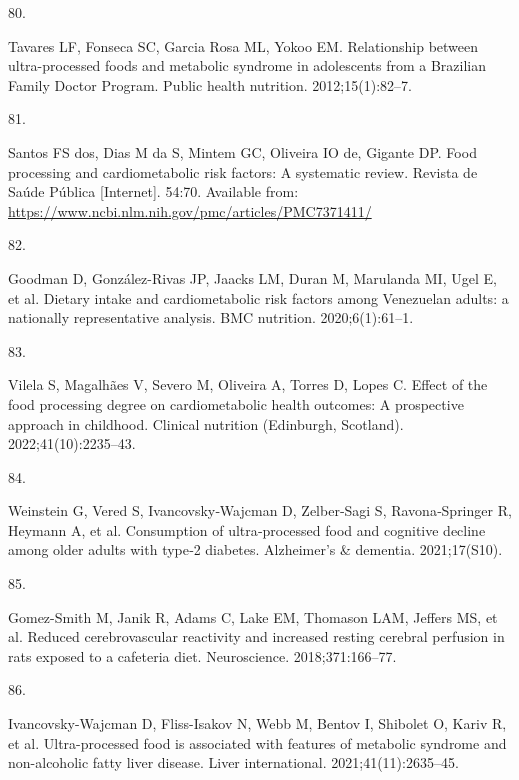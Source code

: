 \documentclass[
]{article}
\newlength{\cslhangindent}
\newlength{\csllabelwidth}
\newlength{\cslentryspacingunit} %
\newenvironment{CSLReferences}[2] %
 {%
  \setlength{\parindent}{0pt}
  \ifodd #1
  \let\oldpar\par
  \def\par{\hangindent=\cslhangindent\oldpar}
  \fi
  \setlength{\parskip}{#2\cslentryspacingunit}
 }%
 {}
\newcommand{\CSLLeftMargin}[1]{\parbox[t]{\csllabelwidth}{#1}}
\newcommand{\CSLRightInline}[1]{\parbox[t]{\linewidth - \csllabelwidth}{#1}\break}
\begin{document}
\begin{CSLReferences}{0}{0}
\leavevmode{}%
\CSLLeftMargin{80. }%
\CSLRightInline{Tavares LF, Fonseca SC, Garcia Rosa ML, Yokoo EM.
Relationship between ultra-processed foods and metabolic syndrome in
adolescents from a {Brazilian Family Doctor Program}. Public health
nutrition. 2012;15(1):82--7. }

\leavevmode{}%
\CSLLeftMargin{81. }%
\CSLRightInline{Santos FS dos, Dias M da S, Mintem GC, Oliveira IO de,
Gigante DP. Food processing and cardiometabolic risk factors: A
systematic review. Revista de Saúde Pública {[}Internet{]}. 54:70.
Available from:
\url{https://www.ncbi.nlm.nih.gov/pmc/articles/PMC7371411/}}

\leavevmode{}%
\CSLLeftMargin{82. }%
\CSLRightInline{Goodman D, González-Rivas JP, Jaacks LM, Duran M,
Marulanda MI, Ugel E, et al. Dietary intake and cardiometabolic risk
factors among Venezuelan adults: a nationally representative analysis.
BMC nutrition. 2020;6(1):61--1. }

\leavevmode{}%
\CSLLeftMargin{83. }%
\CSLRightInline{Vilela S, Magalhães V, Severo M, Oliveira A, Torres D,
Lopes C. Effect of the food processing degree on cardiometabolic health
outcomes: {A} prospective approach in childhood. Clinical nutrition
(Edinburgh, Scotland). 2022;41(10):2235--43. }

\leavevmode{}%
\CSLLeftMargin{84. }%
\CSLRightInline{Weinstein G, Vered S, Ivancovsky‐Wajcman D, Zelber‐Sagi
S, Ravona‐Springer R, Heymann A, et al. Consumption of ultra‐processed
food and cognitive decline among older adults with type‐2 diabetes.
Alzheimer's \& dementia. 2021;17(S10). }

\leavevmode{}%
\CSLLeftMargin{85. }%
\CSLRightInline{Gomez-Smith M, Janik R, Adams C, Lake EM, Thomason LAM,
Jeffers MS, et al. Reduced cerebrovascular reactivity and increased
resting cerebral perfusion in rats exposed to a cafeteria diet.
Neuroscience. 2018;371:166--77. }

\leavevmode{}%
\CSLLeftMargin{86. }%
\CSLRightInline{Ivancovsky-Wajcman D, Fliss-Isakov N, Webb M, Bentov I,
Shibolet O, Kariv R, et al. Ultra{-}processed food is associated with
features of metabolic syndrome and non{-}alcoholic fatty liver disease.
Liver international. 2021;41(11):2635--45. }


\end{CSLReferences}
\end{document}
